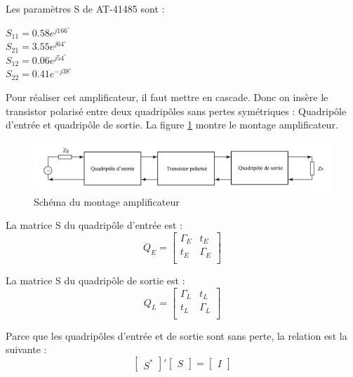 \documentclass[french]{article}
\begin{document}
Les paramètres S de AT-41485 sont :

{\centering
$S_{11}=0.58e^{j166^{\circ}}$\\
$S_{21}=3.55e^{j64^{\circ}}$\\
$S_{12}=0.06e^{j54^{\circ}}$\\
$S_{22}=0.41e^{-j38^{\circ}}$\\
}

Pour réaliser cet amplificateur, il faut mettre en cascade. Donc on insère le transistor polarisé entre deux quadripôles sans pertes symétriques : Quadripôle d’entrée et quadripôle de sortie. La figure \ref{fig:schema_ampli} montre le montage amplificateur. 
\begin{figure}[H]
	\centering
	\includegraphics[width=0.9\linewidth]{../5SynthAmp/Schema_ampli}
	\caption{Schéma du montage amplificateur}
	\label{fig:schema_ampli}
\end{figure}

La matrice S du quadripôle d’entrée est :
\begin{equation}
	Q_{E} = \begin{bmatrix}
		\Gamma_{E} & t_{E}\\
		t_{E} & \Gamma_{E}\\
	\end{bmatrix}
\end{equation}

La matrice S du quadripôle de sortie est :
\begin{equation}
	Q_{L} = \begin{bmatrix}
		\Gamma_{L} & t_{L}\\
		t_{L} & \Gamma_{L}\\
	\end{bmatrix}
\end{equation}

Parce que les quadripôles d'entrée et de sortie sont sans perte, la relation est la suivante :
\begin{equation}
	{\begin{bmatrix}
		S^\ast 
	\end{bmatrix}}'
	\begin{bmatrix}
		S
	\end{bmatrix}=
	\begin{bmatrix}
		I
	\end{bmatrix}
\end{equation}
\end{document}
